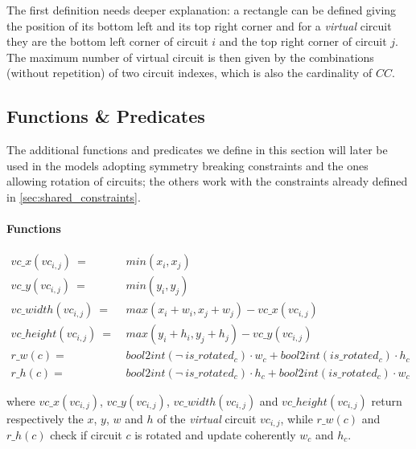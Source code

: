     The first definition needs deeper explanation: a rectangle can be defined giving the position
    of its bottom left and its top right corner and for a \textit{virtual} circuit they are the
    bottom left corner of circuit $i$ and the top right corner of circuit $j$.
    The maximum number of virtual circuit is then given by the combinations (without repetition)
    of two circuit indexes, which is also the cardinality of $CC$. 

    


\subsection{Functions \& Predicates}
    The additional functions and predicates we define in this section will later be used in the models
    adopting symmetry breaking constraints and the ones allowing rotation of circuits; the others work 
    with the constraints already defined in \ref{sec:shared_constraints}.
    
    \paragraph{Functions}
    \begin{align}
        vc\_x(vc_{i,j})\        =\ & min(x_i, x_j)                                                  \\
        vc\_y(vc_{i,j})\        =\ & min(y_i, y_j)                                                  \\
        vc\_width(vc_{i,j})\    =\ & max(x_i + w_i, x_j + w_j) - vc\_x(vc_{i,j})                    \\
        vc\_height(vc_{i,j})\   =\ & max(y_i + h_i, y_j + h_j) - vc\_y(vc_{i,j})                    \\
        r\_w(c) =\  & bool2int(\neg\ is\_rotated_c) \cdot w_c + bool2int(is\_rotated_c) \cdot h_c   
        \label{eq:CP_r_w}   \\
        r\_h(c) =\  & bool2int(\neg\ is\_rotated_c) \cdot h_c + bool2int(is\_rotated_c) \cdot w_c   
        \label{eq:CP_r_h}
    \end{align}

    where $vc\_x(vc_{i,j})$, $vc\_y(vc_{i,j})$, $vc\_width(vc_{i,j})$ and $vc\_height(vc_{i,j})$ 
    return respectively the $x$, $y$, $w$ and $h$ of the \textit{virtual} circuit $vc_{i,j}$, while 
    $r\_w(c)$ and $r\_h(c)$ check if circuit $c$ is rotated and update coherently $w_c$ and $h_c$.

